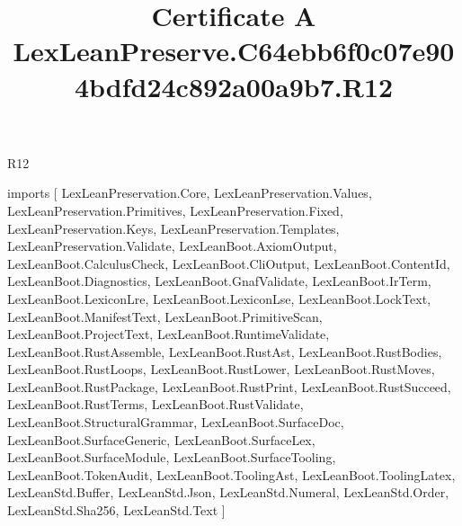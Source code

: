 \begin{lexlean}{R12}
\title{Certificate A LexLeanPreserve.C64ebb6f0c07e904bdfd24c892a00a9b7.R12}
\begin{coremodule}
imports [
  LexLeanPreservation.Core,
  LexLeanPreservation.Values,
  LexLeanPreservation.Primitives,
  LexLeanPreservation.Fixed,
  LexLeanPreservation.Keys,
  LexLeanPreservation.Templates,
  LexLeanPreservation.Validate,
  LexLeanBoot.AxiomOutput,
  LexLeanBoot.CalculusCheck,
  LexLeanBoot.CliOutput,
  LexLeanBoot.ContentId,
  LexLeanBoot.Diagnostics,
  LexLeanBoot.GnafValidate,
  LexLeanBoot.IrTerm,
  LexLeanBoot.LexiconLre,
  LexLeanBoot.LexiconLse,
  LexLeanBoot.LockText,
  LexLeanBoot.ManifestText,
  LexLeanBoot.PrimitiveScan,
  LexLeanBoot.ProjectText,
  LexLeanBoot.RuntimeValidate,
  LexLeanBoot.RustAssemble,
  LexLeanBoot.RustAst,
  LexLeanBoot.RustBodies,
  LexLeanBoot.RustLoops,
  LexLeanBoot.RustLower,
  LexLeanBoot.RustMoves,
  LexLeanBoot.RustPackage,
  LexLeanBoot.RustPrint,
  LexLeanBoot.RustSucceed,
  LexLeanBoot.RustTerms,
  LexLeanBoot.RustValidate,
  LexLeanBoot.StructuralGrammar,
  LexLeanBoot.SurfaceDoc,
  LexLeanBoot.SurfaceGeneric,
  LexLeanBoot.SurfaceLex,
  LexLeanBoot.SurfaceModule,
  LexLeanBoot.SurfaceTooling,
  LexLeanBoot.TokenAudit,
  LexLeanBoot.ToolingAst,
  LexLeanBoot.ToolingLatex,
  LexLeanStd.Buffer,
  LexLeanStd.Json,
  LexLeanStd.Numeral,
  LexLeanStd.Order,
  LexLeanStd.Sha256,
  LexLeanStd.Text
]


\end{coremodule}
\end{lexlean}
